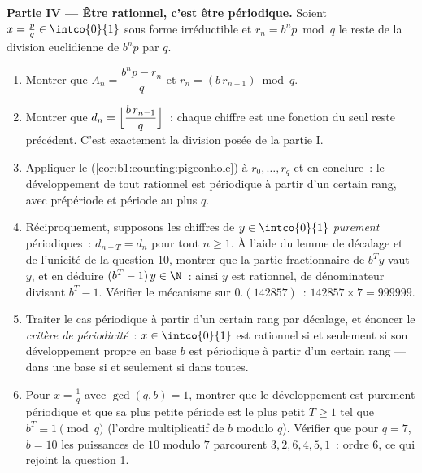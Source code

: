 \begin{problem}
\medskip
\noindent\textbf{Partie IV --- Être rationnel, c'est être
périodique.} Soient $x = \frac pq \in \intco{0}{1}$ sous forme
irréductible et $r_n = b^n p \bmod q$ le reste de la division
euclidienne de $b^n p$ par $q$.
\begin{enumerate}[resume]
  \item Montrer que $A_n = \dfrac{b^n p - r_n}{q}$ et $r_n =
        (b\,r_{n-1}) \bmod q$.
  \item Montrer que $d_n = \Bigl\lfloor \dfrac{b\,r_{n-1}}{q}
        \Bigr\rfloor$~: chaque chiffre est une fonction du seul reste
        précédent. C'est exactement la division posée de la
        partie I.
  \item Appliquer le 
        (\cref{cor:b1:counting:pigeonhole}) à $r_0, \dots, r_q$
        et en conclure~: le développement de tout rationnel est
        périodique à partir d'un certain rang, avec prépériode et
        période au plus $q$.
  \item Réciproquement, supposons les chiffres de $y \in
        \intco{0}{1}$ \emph{purement} périodiques~: $d_{n+T} = d_n$
        pour tout $n \geq 1$. À l'aide du lemme de décalage et de
        l'unicité de la question 10, montrer que la partie
        fractionnaire de $b^T y$ vaut $y$, et en déduire $(b^T -
        1)\,y \in \N$~: ainsi $y$ est rationnel, de dénominateur
        divisant $b^T - 1$. Vérifier le mécanisme sur
        $0.(142857)$~: $142857 \times 7 = 999999$.
  \item Traiter le cas périodique à partir d'un certain rang par
        décalage, et énoncer le \emph{critère de périodicité}~: $x
        \in \intco{0}{1}$ est rationnel si et seulement si son
        développement propre en base $b$ est périodique à partir d'un
        certain rang --- dans une base si et seulement si dans
        toutes.
  \item Pour $x = \frac 1q$ avec $\gcd(q, b) = 1$, montrer que le
        développement est purement périodique et que sa plus petite
        période est le plus petit $T \geq 1$ tel que $b^T \equiv 1
        \pmod q$ (l'ordre multiplicatif de $b$ modulo $q$). Vérifier
        que pour $q = 7$, $b = 10$ les puissances de $10$ modulo $7$
        parcourent $3, 2, 6, 4, 5, 1$~: ordre $6$, ce qui rejoint la
        question 1.
\end{enumerate}


\end{problem}
